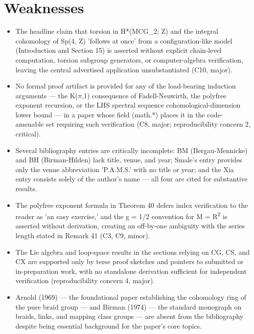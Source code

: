 \documentclass[11pt]{article}
\begin{document}
\section*{Weaknesses}
\begin{itemize}[leftmargin=*]
  \item The headline claim that torsion in H*(MCG\_2; Z) and the integral cohomology of Sp(4, Z) 'follows at once' from a configuration-like model (Introduction and Section 15) is asserted without explicit chain-level computation, torsion subgroup generators, or computer-algebra verification, leaving the central advertised application unsubstantiated (C10, major).
  \item No formal proof artifact is provided for any of the load-bearing induction arguments --- the K(\ensuremath{\pi},1) consequence of Fadell-Neuwirth, the polyfree exponent recursion, or the LHS spectral sequence cohomological-dimension lower bound --- in a paper whose field (math.*) places it in the code-amenable set requiring such verification (C8, major; reproducibility concern 2, critical).
  \item Several bibliography entries are critically incomplete: BM (Bergau-Mennicke) and BH (Birman-Hilden) lack title, venue, and year; Smale's entry provides only the venue abbreviation 'P.A.M.S.' with no title or year; and the Xia entry consists solely of the author's name --- all four are cited for substantive results.
  \item The polyfree exponent formula in Theorem 40 defers index verification to the reader as 'an easy exercise,' and the g = 1/2 convention for M = R\textsuperscript{2} is asserted without derivation, creating an off-by-one ambiguity with the series length stated in Remark 41 (C3, C9, minor).
  \item The Lie algebra and loop-space results in the sections relying on CG, CS, and CX are supported only by terse proof sketches and pointers to submitted or in-preparation work, with no standalone derivation sufficient for independent verification (reproducibility concern 4, major).
  \item Arnold (1969) --- the foundational paper establishing the cohomology ring of the pure braid group --- and Birman (1974) --- the standard monograph on braids, links, and mapping class groups --- are absent from the bibliography despite being essential background for the paper's core topics.
\end{itemize}
\end{document}
